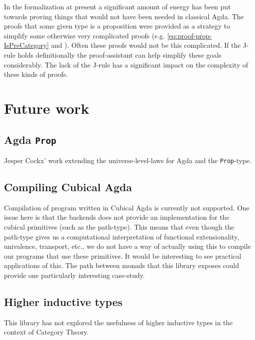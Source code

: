 In the formalization at present a significant amount of energy has been put
towards proving things that would not have been needed in classical Agda. The
proofs that some given type is a proposition were provided as a strategy to
simplify some otherwise very complicated proofs (e.g.
\ref{eq:proof-prop-IsPreCategory} and \label{eq:productPath}). Often these
proofs would not be this complicated. If the J-rule holds definitionally the
proof-assistant can help simplify these goals considerably. The lack of the
J-rule has a significant impact on the complexity of these kinds of proofs.


\section{Future work}
\subsection{Agda \texttt{Prop}}
Jesper Cockx' work extending the universe-level-laws for Agda and the
\texttt{Prop}-type.

\subsection{Compiling Cubical Agda}
\label{sec:compiling-cubical-agda}
Compilation of program written in Cubical Agda is currently not supported. One
issue here is that the backends does not provide an implementation for the
cubical primitives (such as the path-type). This means that even though the
path-type gives us a computational interpretation of functional extensionality,
univalence, transport, etc., we do not have a way of actually using this to
compile our programs that use these primitives. It would be interesting to see
practical applications of this. The path between monads that this library
exposes could provide one particularly interesting case-study.

\subsection{Higher inductive types}
This library has not explored the usefulness of higher inductive types in the
context of Category Theory.
